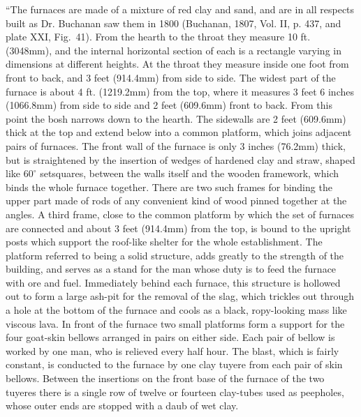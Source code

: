 ``The furnaces are made of a mixture of red clay and sand, and are in all respects built as Dr. Buchanan saw them in 1800 (Buchanan, 1807, Vol. II, p. 437, and plate XXI, Fig.~41). From the hearth to the throat they measure 10 ft. (3048mm), and the internal horizontal section of each is a rectangle varying in dimensions at different heights. At the throat they measure inside one foot from front to back, and 3 feet (914.4mm) from side to side. The widest part of the furnace is about 4 ft. (1219.2mm) from the top, where it measures 3 feet 6 inches (1066.8mm) from side to side and 2 feet (609.6mm) front to back. From this point the bosh narrows down to the hearth. The sidewalls are 2 feet (609.6mm) thick at the top and extend below into a common platform, which joins adjacent pairs of furnaces. The front wall of the furnace is only 3 inches (76.2mm) thick, but is straightened by the insertion of wedges of hardened clay and straw, shaped like $60^\circ$ setsquares, between the walls itself and the wooden framework, which binds the whole furnace together. There are two such frames for binding the upper part made of rods of any convenient kind of wood pinned together at the angles. A third frame, close to the common platform by which the set of furnaces are connected and about 3 feet (914.4mm) from the top, is bound to the upright posts which support the roof-like shelter for the whole establishment. The platform referred to being a solid structure, adds greatly to the strength of the building, and serves as a stand for the man whose duty is to feed the furnace with ore and fuel. Immediately behind each furnace, this structure is hollowed out to form a large ash-pit for the removal of the slag, which trickles out through a hole at the bottom of the furnace and cools as a black, ropy-looking mass like viscous lava. In front of the furnace two small platforms form a support for the four goat-skin bellows arranged in pairs on either side. Each pair of bellow is worked by one man, who is relieved every half hour. The blast, which is fairly constant, is conducted to the furnace by one clay tuyere from each pair of skin bellows. Between the insertions on the front base of the furnace of the two tuyeres there is a single row of twelve or fourteen clay-tubes used as peepholes, whose outer ends are stopped with a daub of wet clay.

